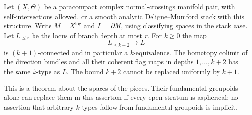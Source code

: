 \begin{theorem}\label{P5a2}
Let $(X,\Theta)$ be a paracompact complex normal-crossings manifold pair,
with self-intersections allowed, or a smooth analytic Deligne--Mumford
stack with this structure.  Write $M=X^{\log}$ and $L=\partial M$, using
classifying spaces in the stack case.  Let $L_{\le r}$ be the locus of
branch depth at most $r$.  For $k\ge0$ the map
\[
 L_{\le k+2}\longrightarrow L
\]
is $(k+1)$-connected and in particular a $k$-equivalence.  The homotopy
colimit of the direction bundles and all their coherent flag maps in
depths $1,\ldots,k+2$ has the same $k$-type as $L$.
The bound $k+2$ cannot be replaced uniformly by $k+1$.

This is a theorem about the spaces of the pieces.  Their fundamental
groupoids alone can replace them in this assertion if every open stratum
is aspherical; no assertion that arbitrary $k$-types follow from
fundamental groupoids is implicit.
\end{theorem}
